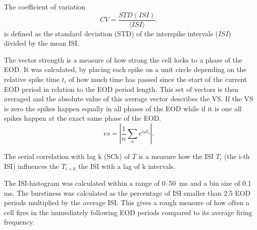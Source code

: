 \documentclass[12pt,a4paper]{article}
\begin{document}
The coefficient of variation
\begin{equation}
  \label{CV}
  CV = \frac{STD(ISI)}{\langle ISI \rangle}.
\end{equation}
is defined as the standard deviation (STD) of the interspike intervals ($ISI$) divided by the mean ISI.

The vector strength is a measure of how strong the cell locks to a phase of the EOD. It was calculated, by placing each spike on a unit circle depending on the relative spike time $t_{i}$ of how much time has passed since the start of
the current EOD period in relation to the EOD period length. This set of vectors is then averaged and the absolute value of this average vector describes the VS. If the VS is zero the spikes happen equally in all phases of the EOD while if it is one all spikes happen at the exact same phase of the EOD.
\begin{equation}
  \label{vs}
  vs = |\frac{1}{n} \sum_n e^{i\omega t_{i}}|.
\end{equation}

The serial correlation with lag k (SCk) of $T$ is a measure how the ISI $T_{i}$ (the i-th ISI) influences the $T_{i+k}$ the ISI with a lag of k intervals.

The ISI-histogram was calculated within a range of 0--50 \,ms and a bin size of 0.1\,ms. The burstiness was calculated as the percentage of ISI smaller than 2.5 EOD periods multiplied by the average ISI. This gives a rough measure of how often a cell fires in the immediately following EOD periods compared to its average firing frequency.
\end{document}
